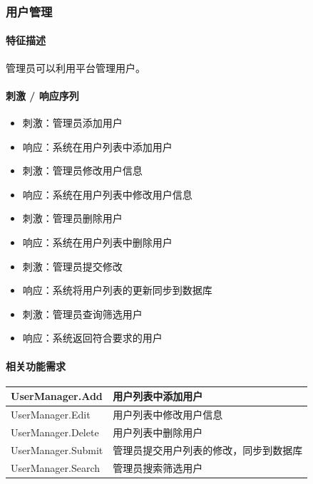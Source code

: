 \documentclass[a4paper]{ctexart}
\begin{document}
\subsubsection{用户管理}

\paragraph{特征描述}

管理员可以利用平台管理用户。

\paragraph{刺激 / 响应序列}

\begin{itemize}
    \item 刺激：管理员添加用户
    \item 响应：系统在用户列表中添加用户
    \item 刺激：管理员修改用户信息
    \item 响应：系统在用户列表中修改用户信息
    \item 刺激：管理员删除用户
    \item 响应：系统在用户列表中删除用户
    \item 刺激：管理员提交修改
    \item 响应：系统将用户列表的更新同步到数据库
    \item 刺激：管理员查询筛选用户
    \item 响应：系统返回符合要求的用户
\end{itemize}

\paragraph{相关功能需求}

\begin{center}
  \begin{tabular}{p{6cm}|p{8cm}}
    \toprule
    UserManager.Add        & 用户列表中添加用户 \\
    \midrule
    UserManager.Edit      & 用户列表中修改用户信息           \\
    \midrule
    UserManager.Delete & 用户列表中删除用户           \\
    \midrule
    UserManager.Submit & 管理员提交用户列表的修改，同步到数据库           \\
    \midrule
    UserManager.Search & 管理员搜索筛选用户          \\
    \bottomrule
  \end{tabular}
\end{center}
\end{document}
